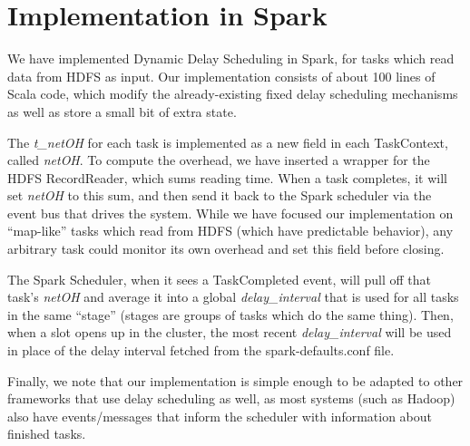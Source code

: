 \section{Implementation in Spark}\label{sec:impl}

We have implemented Dynamic Delay Scheduling in Spark, for tasks which read data
from HDFS as input.
Our implementation consists of about 100 lines of Scala code, which modify the
already-existing fixed delay scheduling mechanisms as well as store a small bit
of extra state.

The \textit{t\_netOH} for each task is implemented as a new field in 
each TaskContext, called \textit{netOH}. To compute the overhead, we have inserted a 
wrapper for the HDFS RecordReader, which sums reading time. When a task completes, it 
will set \textit{netOH} to this sum, and then send it back to the Spark scheduler via the 
event bus that drives the system. While we have focused our implementation on ``map-like'' 
tasks which read from HDFS (which have predictable behavior), any arbitrary task could 
monitor its own overhead and set this field before closing.

The Spark Scheduler, when it sees a TaskCompleted event, will pull off that task's 
\textit{netOH} and average it into a global \textit{delay\_interval} that is used for all 
tasks in the same ``stage'' (stages are groups of tasks which do the same thing). Then, 
when a slot opens up in the cluster, the most recent \textit{delay\_interval} will be 
used in place of the delay interval fetched from the spark-defaults.conf file. 

Finally, we note that our implementation is simple enough to be adapted to other frameworks
that use delay scheduling as well, as most systems (such as Hadoop) also have events/messages
that inform the scheduler with information about finished tasks.

